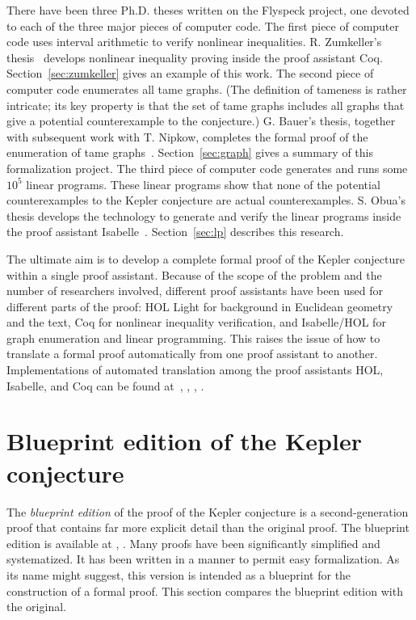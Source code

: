 \documentclass[11pt]{amsart}
\begin{document}
There have been three Ph.D. theses written on the Flyspeck
project, one devoted to each of the three major pieces of computer code.
The first piece of computer code uses interval arithmetic to verify nonlinear inequalities.  R. Zumkeller's thesis~\cite{roland-thesis} develops nonlinear inequality proving inside the proof assistant Coq.  Section~\ref{sec:zumkeller} gives an example of this work.
The second piece of computer code enumerates all tame graphs.
(The definition of tameness is rather intricate; its key property is that the set of tame graphs 
includes all graphs that give a potential counterexample to the conjecture.)
G. Bauer's thesis, together with subsequent 
work with T. Nipkow, completes the formal
proof of the enumeration of tame graphs~\cite{NipkowBS-IJCAR06}.
Section~\ref{sec:graph} gives a summary of this formalization project.
The third piece of computer code generates and runs some $10^5$ linear
programs.   These linear programs show that none of the potential counterexamples
to the Kepler conjecture are actual counterexamples.  S. Obua's thesis develops the
technology to generate and verify the linear programs inside the proof assistant Isabelle~\cite{obua:phd}. 
Section~\ref{sec:lp} describes this research.
 



The ultimate aim is to develop a complete formal proof of the Kepler
conjecture within a single proof assistant.  Because of the scope of 
the problem and the number of researchers involved, different proof
assistants have been used for different parts of the proof:
HOL Light for background
in Euclidean geometry and the text,
Coq for
nonlinear inequality verification, and
Isabelle/HOL for graph enumeration and linear programming.  This raises the issue of how
to translate a formal proof automatically from one proof assistant to another.
Implementations of automated translation among the
proof assistants HOL, Isabelle, and Coq can be found 
at~\cite{obua:import}, \cite{McLaughlin:2006:IJCAR}, \cite{wiedijk:encoding},
\cite{695027}.


\section{Blueprint edition of the Kepler conjecture}
\label{sec:blueprint}

The {\it blueprint edition} of the proof of the Kepler conjecture is a second-generation proof that contains far more explicit detail than the original proof.  The blueprint edition is available at \cite{hales:2008:blueprint}, \cite{hales:2008:collection}.   Many proofs have been significantly simplified and systematized.   It has been written in a manner to permit easy formalization.  As its name might suggest, this version is intended as a blueprint for the construction of a formal proof.
This section 
compares the blueprint edition with the original.
\end{document}
